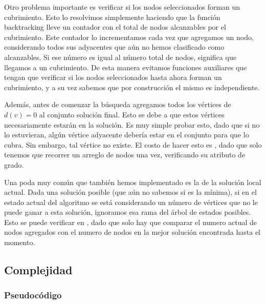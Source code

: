Otro problema importante es verificar si los nodos seleccionados forman un cubrimiento. Esto lo resolvimos simplemente haciendo que la función backtracking lleve un contador con el total de nodos alcanzables por el cubrimiento. Este contador lo incrementamos cada vez que agregamos un nodo, considerando todos sus adyacentes que aún no hemos clasificado como alcanzables. Si ese número es igual al número total de nodos, significa que llegamos a un cubrimiento. De esta manera evitamos funciones auxiliares que tengan que verificar si los nodos seleccionados hasta ahora forman un cubrimiento, y a su vez sabemos que por construcción el mismo es independiente.

Además, antes de comenzar la búsqueda agregamos todos los vértices de $d(v) = 0$ al conjunto solución final. Esto se debe a que estos vértices necesariamente estarán en la solución. Es muy simple probar esto, dado que si no lo estuvieran, algún vértice adyacente debería estar en el conjunto para que lo cubra. Sin embargo, tal vértice no existe. El costo de hacer esto es , dado que solo tenemos que recorrer un arreglo de nodos una vez, verificando su atributo de grado.

Una poda muy común que también hemos implementado es la de la solución local actual. Dada una solución posible (que aún no sabemos si es la mínima), si en el estado actual del algoritmo se está considerando un número de vértices que no le puede ganar a esta solución, ignoramos esa rama del árbol de estados posibles. Esto se puede verificar en , dado que solo hay que comparar el numero actual de nodos agregados con el numero de nodos en la mejor solución encontrada hasta el momento.

\pagebreak

\subsection{Complejidad}

\subsubsection{Pseudocódigo}

